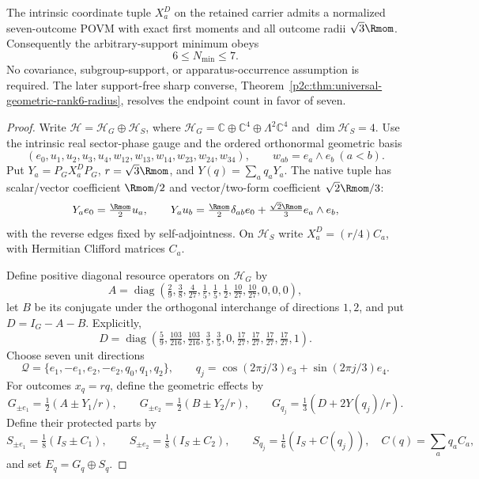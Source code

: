 \documentclass[12pt,a4paper]{article}
\begin{document}
\begin{theorem}
\label{p2c:thm:v255-seven-outcome-attainment}
The intrinsic coordinate tuple $X_a^D$ on the retained carrier admits a
normalized seven-outcome POVM with exact first moments and all outcome radii
$\sqrt3\Rmom$. Consequently the arbitrary-support minimum obeys
\[
                 6\le N_{\min}\le7.
\]
No covariance, subgroup-support, or apparatus-occurrence assumption is
required. The later support-free sharp converse,
Theorem~\ref{p2c:thm:universal-geometric-rank6-radius},
resolves the endpoint count in favor of seven.
\end{theorem}
\begin{proof}
Write $\mathcal H=\mathcal H_G\oplus\mathcal H_S$, where
$\mathcal H_G=\mathbb C\oplus\mathbb C^4\oplus\Lambda^2\mathbb C^4$
and $\dim\mathcal H_S=4$. Use the intrinsic real sector-phase gauge and the
ordered orthonormal geometric basis
\[
 (e_0,u_1,u_2,u_3,u_4,w_{12},w_{13},w_{14},w_{23},w_{24},w_{34}),
 \qquad w_{ab}=e_a\wedge e_b\ (a<b).
\]
Put $Y_a=P_GX_a^DP_G$, $r=\sqrt3\Rmom$, and $Y(q)=\sum_aq_aY_a$.
The native tuple has scalar/vector coefficient $\Rmom/2$ and
vector/two-form coefficient $\sqrt2\Rmom/3$:
\[
 Y_ae_0=\tfrac{\Rmom}{2}u_a,\qquad
 Y_au_b=\tfrac{\Rmom}{2}\delta_{ab}e_0+
                   \tfrac{\sqrt2\Rmom}{3}e_a\wedge e_b,
\]
with the reverse edges fixed by self-adjointness. On $\mathcal H_S$ write
$X_a^D=(r/4)C_a$, with Hermitian Clifford matrices $C_a$.

Define positive diagonal resource operators on $\mathcal H_G$ by
\[
 A=\operatorname{diag}\left(
 \tfrac29,\tfrac38,\tfrac4{27},\tfrac15,\tfrac15,
 \tfrac12,\tfrac{10}{27},\tfrac{10}{27},0,0,0\right),
\]
let $B$ be its conjugate under the orthogonal interchange of directions $1,2$,
and put $D=I_G-A-B$. Explicitly,
\[
 D=\operatorname{diag}\left(
 \tfrac59,\tfrac{103}{216},\tfrac{103}{216},\tfrac35,\tfrac35,
 0,\tfrac{17}{27},\tfrac{17}{27},\tfrac{17}{27},\tfrac{17}{27},1\right).
\]
Choose seven unit directions
\[
 \mathcal Q=\{e_1,-e_1,e_2,-e_2,q_0,q_1,q_2\},\qquad
 q_j=\cos(2\pi j/3)e_3+\sin(2\pi j/3)e_4.
\]
For outcomes $x_q=rq$, define the geometric effects by
\[
 G_{\pm e_1}=\tfrac12(A\pm Y_1/r),\qquad
 G_{\pm e_2}=\tfrac12(B\pm Y_2/r),\qquad
 G_{q_j}=\tfrac13(D+2Y(q_j)/r).
\]
Define their protected parts by
\[
 S_{\pm e_1}=\tfrac18(I_S\pm C_1),\qquad
 S_{\pm e_2}=\tfrac18(I_S\pm C_2),\qquad
 S_{q_j}=\tfrac16(I_S+C(q_j)),
 \quad C(q)=\sum_aq_aC_a,
\]
and set $E_q=G_q\oplus S_q$.


\end{proof}
\end{document}
